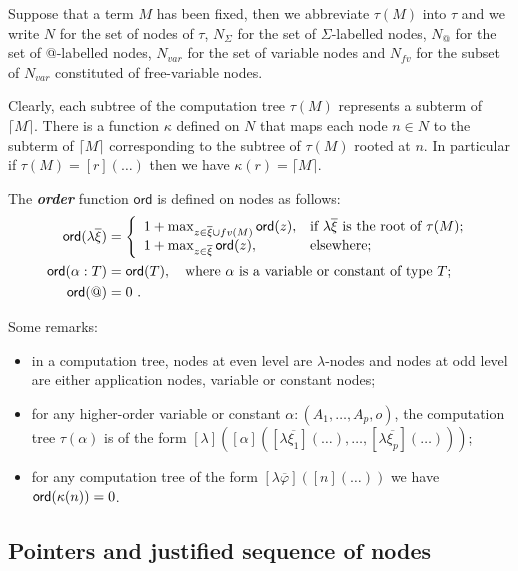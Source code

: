 \documentclass{llncs}
\newcommand\defname[1]{{\bf\em #1}\index{#1}}
\newcommand\aux[1]{\lceil #1\rceil}
\newcommand\ord[1]{{\sf ord}(#1)}
\newcommand\union{\cup}
\begin{document}
Suppose that a term $M$ has been fixed, then we abbreviate $\tau(M)$ into $\tau$  and we write
$N$ for the set of nodes of $\tau$, $N_\Sigma$ for the set of $\Sigma$-labelled nodes,
$N_@$ for the set of @-labelled nodes, $N_{var}$ for the set of variable nodes and
$N_{fv}$ for the subset of $N_{var}$ constituted of free-variable nodes.


Clearly, each subtree of the computation tree $\tau(M)$ represents a subterm of $\aux{M}$.
There is a function $\kappa$ defined on $N$ that maps each node $n \in N$ to the subterm of $\aux{M}$ corresponding to the subtree of $\tau(M)$ rooted at $n$.
In particular if $\tau(M) = [r](\ldots)$ then we have $\kappa(r) = \aux{M}$.

The \defname{order} function $\textsf{ord}$ is defined on nodes as follows:
\begin{align*}
    \ord{\lambda \overline{\xi}} &=
\left\{
  \begin{array}{ll}
    1 +  \max_{z\in \overline{\xi}\union fv(M)} \ord{z}, & \hbox{if $\lambda \overline{\xi}$ is the root of $\tau(M)$;} \\
    1 + \max_{z\in \overline{\xi}} \ord{z}, & \hbox{elsewhere;}
  \end{array}
\right. \\
    \ord{\alpha:T} &= \ord{T}, \quad \hbox{where $\alpha$ is a variable or constant of type $T$;} \\
    \ord{@} &= 0 \ .
\end{align*}

\noindent Some remarks:
\begin{itemize}
\item in a computation tree, nodes at even level are $\lambda$-nodes and nodes at odd level are either application nodes,
variable or constant nodes;
\item for any higher-order variable or constant $\alpha : (A_1,\ldots,A_p,o)$, the computation tree $\tau(\alpha)$ is of the form
$ [\lambda](
        [\alpha]([\lambda \overline{\xi_1}](\ldots), \ldots, [\lambda \overline{\xi_p}](\ldots))
        )
$;

\item for any computation tree of the form $[\lambda \overline{\varphi}]([n]( \ldots ))$ we have $\ord{\kappa(n)}=0$.
\end{itemize}







\subsection{Pointers and justified sequence of nodes}
\end{document}
